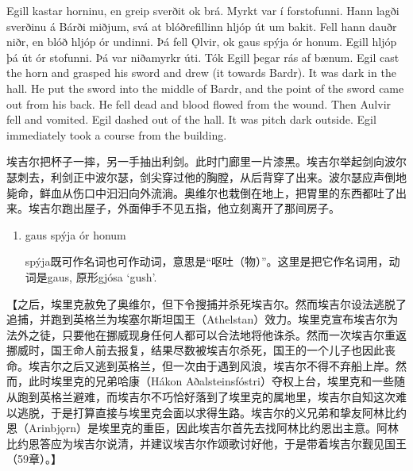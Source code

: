\begin{paracol}{2}
    Egill kastar horninu, en greip sverðit ok brá. Myrkt var í forstofunni. Hann lagði sverðinu á Bárði miðjum, svá at blóðrefillinn hljóp út um bakit. Fell hann dauðr niðr, en blóð hljóp ór undinni. Þá fell Ǫlvir, ok gaus spýja ór honum. Egill hljóp þá út ór stofunni. Þá var niðamyrkr úti. Tók Egill þegar rás af bænum.
    \switchcolumn
    Egil cast the horn and grasped his sword and drew (it towards Bardr). It was dark in the hall. He put the sword into the middle of Bardr, and the point of the sword came out from his back. He fell dead and blood flowed from the wound. Then Aulvir fell and vomited. Egil dashed out of the hall. It was pitch dark outside. Egil immediately took a course from the building.
\end{paracol}
\begin{translation*}{}
    埃吉尔把杯子一摔，另一手抽出利剑。此时门廊里一片漆黑。埃吉尔举起剑向波尔瑟刺去，利剑正中波尔瑟，剑尖穿过他的胸膛，从后背穿了出来。波尔瑟应声倒地毙命，鲜血从伤口中汩汩向外流淌。奥维尔也栽倒在地上，把胃里的东西都吐了出来。埃吉尔跑出屋子，外面伸手不见五指，他立刻离开了那间房子。
\end{translation*}
\begin{grammar*}{}
    \begin{enumerate}[leftmargin=*]
        \item gaus spýja ór honum

              spýja既可作名词也可作动词，意思是“呕吐（物）”。这里是把它作名词用，动词是gaus, 原形gjósa `gush'.
    \end{enumerate}
\end{grammar*}
\medskip
【之后，埃里克赦免了奥维尔，但下令搜捕并杀死埃吉尔。然而埃吉尔设法逃脱了追捕，并跑到英格兰为埃塞尔斯坦国王（Athelstan）效力。埃里克宣布埃吉尔为法外之徒，只要他在挪威现身任何人都可以合法地将他诛杀。然而一次埃吉尔重返挪威时，国王命人前去报复，结果尽数被埃吉尔杀死，国王的一个儿子也因此丧命。埃吉尔之后又逃到英格兰，但一次由于遇到风浪，埃吉尔不得不弃船上岸。然而，此时埃里克的兄弟哈康（Hákon Aðalsteinsfóstri）夺权上台，埃里克和一些随从跑到英格兰避难，而埃吉尔不巧恰好落到了埃里克的属地里，埃吉尔自知这次难以逃脱，于是打算直接与埃里克会面以求得生路。埃吉尔的义兄弟和挚友阿林比约恩（Arinbjǫrn）是埃里克的重臣，因此埃吉尔首先去找阿林比约恩出主意。阿林比约恩答应为埃吉尔说清，并建议埃吉尔作颂歌讨好他，于是带着埃吉尔觐见国王（59章）。】
\medskip
